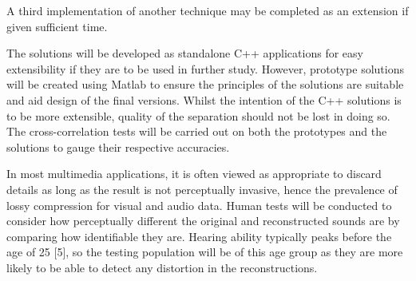 \documentclass[12pt,a4paper,twoside,openright]{report}
\begin{document}
A third implementation of another technique may be completed as an extension if given sufficient time.

The solutions will be developed as standalone C++ applications for easy extensibility if they are to be used in further study. However, prototype solutions will be created using Matlab to ensure the principles of the solutions are suitable and aid design of the final versions. Whilst the intention of the C++ solutions is to be more extensible, quality of the separation should not be lost in doing so. The cross-correlation tests will be carried out on both the prototypes and the solutions to gauge their respective accuracies.

In most multimedia applications, it is often viewed as appropriate to discard details as long as the result is not perceptually invasive, hence the prevalence of lossy compression for visual and audio data. Human tests will be conducted to consider how perceptually different the original and reconstructed sounds are by comparing how identifiable they are. Hearing ability typically peaks before the age of 25 [5], so the testing population will be of this age group as they are more likely to be able to detect any distortion in the reconstructions.

%
%
%
%
%
\end{document}
